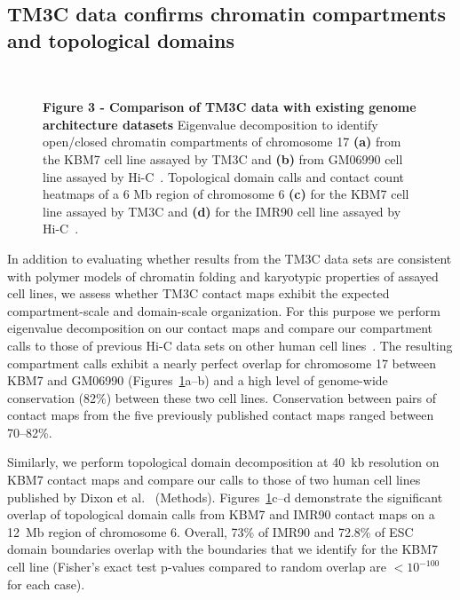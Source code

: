 \subsection*{TM3C data confirms chromatin compartments and topological domains}
{

\begin{figure}
  \centering
  \hspace{0.05\textwidth}
  \vspace{0.02\textheight}
  \\[-\lineskip]
  \hspace{0.05\textwidth}
\caption{
\textbf{Figure 3 - Comparison of TM3C data with existing genome architecture datasets}
Eigenvalue decomposition to identify open/closed chromatin compartments of
chromosome 17 {\bf(a)} from the KBM7 cell line assayed by TM3C and {\bf(b)}
from GM06990 cell line assayed by Hi-C~\cite{lieberman-aiden:comprehensive}.
Topological domain calls and contact count heatmaps of a 6 Mb region of chromosome 6
{\bf(c)} for the KBM7 cell line assayed by TM3C and {\bf(d)} for the
IMR90 cell line assayed by Hi-C~\cite{dixon:topological}.
}
\label{fig:cellLineComparison}
\end{figure}


In addition to evaluating whether results from the TM3C data sets are consistent with
polymer models of chromatin folding and karyotypic properties of assayed cell lines,
we assess whether TM3C contact maps exhibit the expected compartment-scale and domain-scale
organization. For this purpose we perform eigenvalue decomposition on our
contact maps and compare our compartment calls to those of previous Hi-C data sets
on other human cell lines~\cite{lieberman-aiden:comprehensive,dixon:topological}.
The resulting compartment calls exhibit a nearly perfect overlap for chromosome 17
between KBM7 and GM06990 (Figures~\ref{fig:cellLineComparison}a--b)
and a high level
of genome-wide conservation (82$\%$) between these two cell lines. Conservation
between pairs of contact maps from the five previously published contact maps
ranged between 70--82\%.

Similarly, we perform topological domain decomposition at 40~kb resolution on
KBM7 contact maps and compare our calls to those of two human cell lines
published by Dixon et al.~\cite{dixon:topological} (Methods).
Figures~\ref{fig:cellLineComparison}c--d demonstrate the significant overlap of
topological domain calls from KBM7 and IMR90 contact maps on a 12~Mb region of
chromosome 6. Overall, 73\% of IMR90 and 72.8\% of ESC domain boundaries overlap
with the boundaries that we identify for the KBM7 cell line
(Fisher's exact test p-values compared to random overlap are $<10^{-100}$ for each case).
}


